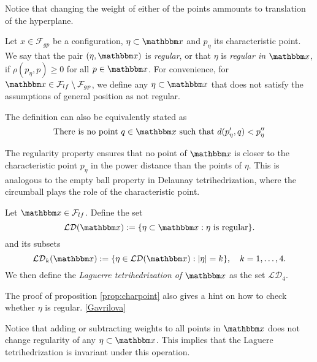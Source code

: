 Notice that changing the weight of either of the points ammounts to translation of the hyperplane. 


\begin{definition}
	Let $x\in \mathcal F_{gp}$ be a configuration, $\eta \subset \x$ and $p_\eta$ its characteristic point. We say that the pair $(\eta,\x)$ is \textit{regular}, or that $\eta$ is \textit{regular in} $\x$, if $\rho(p_\eta,p)\geq 0$ for all $p\in\x$.	
	For convenience, for $\x \in \mathcal F_{lf}\setminus \mathcal F_{gp}$, we define any $\eta\subset \x$ that does not satisfy the assumptions of general position as not regular.
\end{definition}
The definition can also be equivalently stated as 
$$\text{There is no point } q\in\x \text{ such that } d(p'_\eta,q)<p''_\eta$$

The regularity property ensures that no point of $\x$ is closer to the characteristic point $p_\eta$ in the power distance than the points of $\eta$. This is analogous to the empty ball property in Delaunay tetrihedrization, where the circumball plays the role of the characteristic point.   




\begin{definition}
	Let $\x \in \mathcal F_{lf}$. Define the set 
	$$\mathcal {LD}(\x) := \{\eta\subset \x: \eta \text{ is regular}\}.$$
	and its subsets
	$$\mathcal {LD}_k(\x) := \{\eta \in \mathcal {LD}(\x): |\eta|=k \},\quad k = 1,\dots,4.$$
	We then define the \textit{Laguerre tetrihedrization of $\x$} as the set $\mathcal {LD}_4$. 
\end{definition}


\begin{remark}\label{r:construct}
	The proof of proposition \ref{prop:charpoint} also gives a hint on how to check whether $\eta$ is regular. \ref{Gavrilova}\tbd 
\end{remark}



\begin{remark}
	Notice that adding or subtracting weights to all points in $\x$ does not change regularity of any $\eta \subset \x$. This implies that the Laguere tetrihedrization is invariant under this operation.  
\end{remark}

